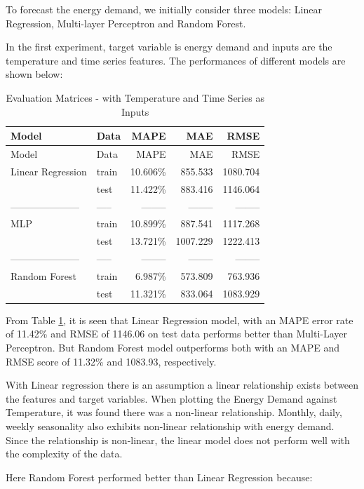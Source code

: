 \documentclass[mstat,12pt]{unswthesis}
\begin{document}
To forecast the energy demand, we initially consider three models:
Linear Regression, Multi-layer Perceptron and Random Forest.

In the first experiment, target variable is energy demand and inputs are
the temperature and time series features. The performances of different
models are shown below:

\begin{longtable}[]{@{}llrrr@{}}
\caption{\label{tab:eval-matrix-temp-time} Evaluation Matrices - with
Temperature and Time Series as Inputs}\tabularnewline
\toprule\noalign{}
Model & Data & MAPE & MAE & RMSE \\
\midrule\noalign{}
\endfirsthead
\toprule\noalign{}
Model & Data & MAPE & MAE & RMSE \\
\midrule\noalign{}
\endhead
\bottomrule\noalign{}
\endlastfoot
Linear Regression & train & 10.606\% & 855.533 & 1080.704 \\
& test & 11.422\% & 883.416 & 1146.064 \\
--------------------- & ----- & -------- & -------- & -------- \\
MLP & train & 10.899\% & 887.541 & 1117.268 \\
& test & 13.721\% & 1007.229 & 1222.413 \\
--------------------- & ----- & -------- & -------- & -------- \\
Random Forest & train & 6.987\% & 573.809 & 763.936 \\
& test & 11.321\% & 833.064 & 1083.929 \\
\end{longtable}

From Table \ref{tab:eval-matrix-temp-time}, it is seen that Linear
Regression model, with an MAPE error rate of 11.42\% and RMSE of 1146.06
on test data performs better than Multi-Layer Perceptron. But Random
Forest model outperforms both with an MAPE and RMSE score of 11.32\% and
1083.93, respectively.

With Linear regression there is an assumption a linear relationship
exists between the features and target variables. When plotting the
Energy Demand against Temperature, it was found there was a non-linear
relationship. Monthly, daily, weekly seasonality also exhibits
non-linear relationship with energy demand. Since the relationship is
non-linear, the linear model does not perform well with the complexity
of the data.

Here Random Forest performed better than Linear Regression because:
\end{document}
